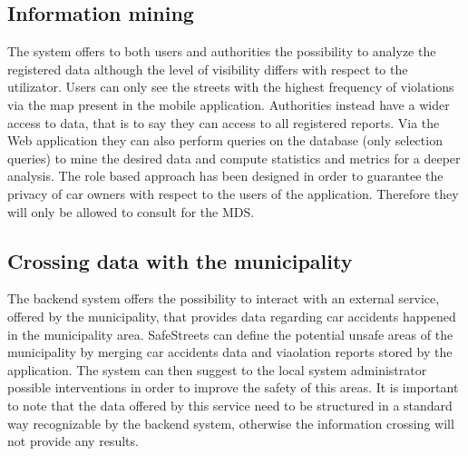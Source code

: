 \subsection{Information mining}
The system offers to both users and authorities the possibility to analyze the registered data although the level of visibility differs with respect to the utilizator. 
Users can only see the streets with the highest frequency of violations via the map present in the mobile application. Authorities instead have a wider access to data, that is to say they can access to all registered reports. Via the Web application they can also perform queries on the database (only selection queries) to mine the desired data and compute statistics and metrics for a deeper analysis. The role based approach has been designed in order to guarantee the privacy of car owners with respect to the users of the application. Therefore they will only be allowed to consult for the MDS.

\subsection{Crossing data with the municipality}
The backend system offers the possibility to interact with an external service, offered by the municipality, that provides data regarding car accidents happened in the municipality area. SafeStreets can define the potential unsafe areas of the municipality by merging car accidents data and viaolation reports stored by the application. The system can then suggest to the local system administrator possible interventions in order to improve the safety of this areas. It is important to note that the data offered by this service need to be structured in a standard way recognizable by the backend system, otherwise the information crossing will not provide any results.

